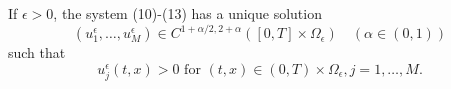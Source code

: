 \begin{theorem} 
    If $\epsilon>0$, the system (10)-(13) has a unique solution
    $$
    \left(u_{1}^{\epsilon}, \ldots, u_{M}^{\epsilon}\right) \in C^{1+\alpha / 2,2+\alpha}\left([0, T] \times \Omega_{\epsilon}\right) \quad(\alpha \in(0,1))
    $$
    such that
    $$
    u_{j}^{\epsilon}(t, x)>0 \text { for }(t, x) \in(0, T) \times \Omega_{\epsilon}, j=1, \ldots, M .
    $$
    \label{thm 4.1}
\end{theorem}
